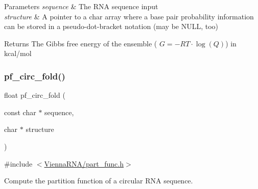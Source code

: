 \begin{DoxyParams}{Parameters}
{\em sequence} & The R\+NA sequence input \\
\hline
{\em structure} & A pointer to a char array where a base pair probability information can be stored in a pseudo-\/dot-\/bracket notation (may be N\+U\+LL, too) \\
\hline
\end{DoxyParams}
\begin{DoxyReturn}{Returns}
The Gibbs free energy of the ensemble ( $G = -RT \cdot \log(Q) $) in kcal/mol 
\end{DoxyReturn}
\mbox{\label{group__pf__fold_ga819ce5fca8984004ac81c4a3b04cb735}} 
\subsubsection{\texorpdfstring{pf\+\_\+circ\+\_\+fold()}{pf\_circ\_fold()}}
{\footnotesize\ttfamily float pf\+\_\+circ\+\_\+fold (\begin{DoxyParamCaption}\item[{const char $\ast$}]{sequence,  }\item[{char $\ast$}]{structure }\end{DoxyParamCaption})}



{\ttfamily \#include $<$\hyperlink{part__func_8h}{Vienna\+R\+N\+A/part\+\_\+func.\+h}$>$}



Compute the partition function of a circular R\+NA sequence. 

